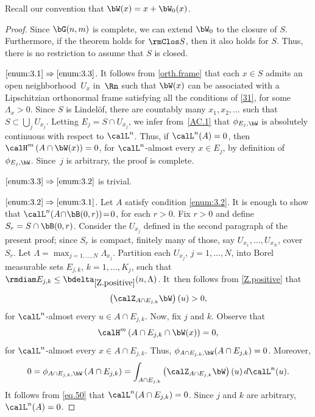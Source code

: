 Recall our convention that $\bW(x) = x + \bW_0(x)$.

\begin{proof}
Since $\bG(n,m)$ is complete, we can extend $\bW_0$ to the closure of $S$.
Furthermore, if the theorem holds for $\rmClos S$, then it also holds for $S$.
Thus, there is no restriction to assume that $S$ is closed.
\par
$\eqref{enum:3.1} \Rightarrow \eqref{enum:3.3}$. It follows from \ref{orth.frame} that each $x \in S$ admits an open neighborhood~$U_x$ in~$\Rn$ such that $\bW(x)$ can be associated with a Lipschitzian orthonormal frame satisfying all the conditions of \ref{31}, for some $\Lambda_x > 0$.
Since $S$ is Lindel\"of, there are countably many $x_1,x_2,\ldots$ such that $S \subset \bigcup_j U_{x_j}$.
Letting $E_j = S \cap U_{x_j}$, we infer from~\ref{AC.1} that $\phi_{E_j,\bW}$ is absolutely continuous with respect to $\calL^n$.
Thus, if $\calL^n(A)=0$, then $\calH^m\left(A \cap \bW(x)\right)=0$, for $\calL^n$-almost every $x \in E_j$, by definition of $\phi_{E_j,\bW}$.
Since~$j$ is arbitrary, the proof is complete.
\par
$\eqref{enum:3.3} \Rightarrow \eqref{enum:3.2}$ is trivial.
\par
$\eqref{enum:3.2}\Rightarrow \eqref{enum:3.1}$. Let $A$ satisfy condition \eqref{enum:3.2}.
It is enough to show that \hbox{$\calL^n(A \!\cap\! \bB(0,r)) \!=\! 0$}, for each $r > 0$.
Fix $r > 0$ and define $S_r = S \cap \bB(0,r)$.
Consider the $U_{x_j}$ defined in the second paragraph of the present proof; since $S_r$ is compact, finitely many of those, say $U_{x_1},\ldots,U_{x_N}$, cover $S_r$.
Let $\Lambda = \max_{j=1,\ldots,N} \Lambda_{x_j}$.
Partition each $U_{x_j}$, $j=1,\ldots,N$, into Borel measurable sets $E_{j,k}$, $k=1,\ldots,
K_j$, such that $\rmdiam E_{j,k} \leq \bdelta_{\ref{Z.positive}}(n,\Lambda)$.
It~then follows from \ref{Z.positive} that
\begin{equation}
\label{eq.50}
\left(\calZ_{A \cap E_{j,k}} \bW \right)(u) > 0,
\end{equation}
for $\calL^n$-almost every $u \in A \cap E_{j,k}$.
Now, fix $j$ and $k$.
Observe that
\[
\calH^m \left(A \cap E_{j,k} \cap \bW(x) \right) = 0,
\]
for $\calL^n$-almost every $x \in A \cap E_{j,k}$.
Thus, $\phi_{A \cap E_{j,k},\bW}(A \cap E_{j,k}) =0$.
Moreover,
\begin{equation*}
0 = \phi_{A \cap E_{j,k},\bW}\left(A \cap E_{j,k}\right) = \int_{A \cap E_{j,k}} \left(\calZ_{A \cap E_{j,k}} \bW \right)(u) \,d\calL^n(u).
\end{equation*}
It follows from \eqref{eq.50} that $\calL^n(A \cap E_{j,k}) =0$.
Since $j$ and $k$ are arbitrary, \hbox{$\calL^n(A)=0$}.
\end{proof}

